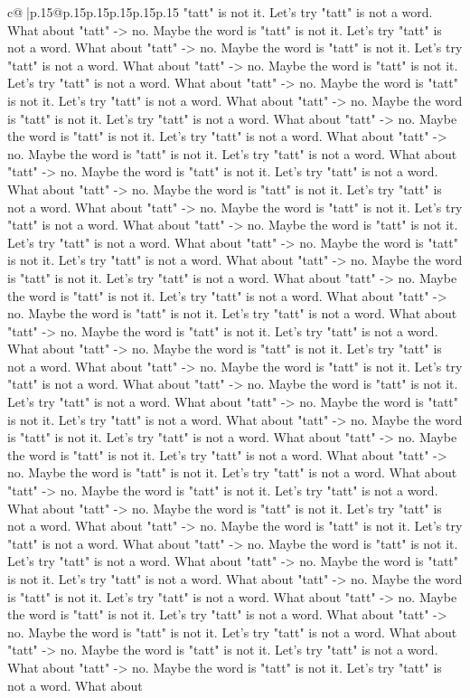 \documentclass{article}
\begin{document}
{\begin{supertabular}{c@{$\;$}|p{.15\linewidth}@{}p{.15\linewidth}p{.15\linewidth}p{.15\linewidth}p{.15\linewidth}p{.15\linewidth}}
{{{"tatt" is not it. Let's try "tatt" is not a word. What about "tatt" {-}> no. Maybe the word is "tatt" is not it. Let's try "tatt" is not a word. What about "tatt" {-}> no. Maybe the word is "tatt" is not it. Let's try "tatt" is not a word. What about "tatt" {-}> no. Maybe the word is "tatt" is not it. Let's try "tatt" is not a word. What about "tatt" {-}> no. Maybe the word is "tatt" is not it. Let's try "tatt" is not a word. What about "tatt" {-}> no. Maybe the word is "tatt" is not it. Let's try "tatt" is not a word. What about "tatt" {-}> no. Maybe the word is "tatt" is not it. Let's try "tatt" is not a word. What about "tatt" {-}> no. Maybe the word is "tatt" is not it. Let's try "tatt" is not a word. What about "tatt" {-}> no. Maybe the word is "tatt" is not it. Let's try "tatt" is not a word. What about "tatt" {-}> no. Maybe the word is "tatt" is not it. Let's try "tatt" is not a word. What about "tatt" {-}> no. Maybe the word is "tatt" is not it. Let's try "tatt" is not a word. What about "tatt" {-}> no. Maybe the word is "tatt" is not it. Let's try "tatt" is not a word. What about "tatt" {-}> no. Maybe the word is "tatt" is not it. Let's try "tatt" is not a word. What about "tatt" {-}> no. Maybe the word is "tatt" is not it. Let's try "tatt" is not a word. What about "tatt" {-}> no. Maybe the word is "tatt" is not it. Let's try "tatt" is not a word. What about "tatt" {-}> no. Maybe the word is "tatt" is not it. Let's try "tatt" is not a word. What about "tatt" {-}> no. Maybe the word is "tatt" is not it. Let's try "tatt" is not a word. What about "tatt" {-}> no. Maybe the word is "tatt" is not it. Let's try "tatt" is not a word. What about "tatt" {-}> no. Maybe the word is "tatt" is not it. Let's try "tatt" is not a word. What about "tatt" {-}> no. Maybe the word is "tatt" is not it. Let's try "tatt" is not a word. What about "tatt" {-}> no. Maybe the word is "tatt" is not it. Let's try "tatt" is not a word. What about "tatt" {-}> no. Maybe the word is "tatt" is not it. Let's try "tatt" is not a word. What about "tatt" {-}> no. Maybe the word is "tatt" is not it. Let's try "tatt" is not a word. What about "tatt" {-}> no. Maybe the word is "tatt" is not it. Let's try "tatt" is not a word. What about "tatt" {-}> no. Maybe the word is "tatt" is not it. Let's try "tatt" is not a word. What about "tatt" {-}> no. Maybe the word is "tatt" is not it. Let's try "tatt" is not a word. What about "tatt" {-}> no. Maybe the word is "tatt" is not it. Let's try "tatt" is not a word. What about "tatt" {-}> no. Maybe the word is "tatt" is not it. Let's try "tatt" is not a word. What about "tatt" {-}> no. Maybe the word is "tatt" is not it. Let's try "tatt" is not a word. What about "tatt" {-}> no. Maybe the word is "tatt" is not it. Let's try "tatt" is not a word. What about "tatt" {-}> no. Maybe the word is "tatt" is not it. Let's try "tatt" is not a word. What about "tatt" {-}> no. Maybe the word is "tatt" is not it. Let's try "tatt" is not a word. What about "tatt" {-}> no. Maybe the word is "tatt" is not it. Let's try "tatt" is not a word. What about "tatt" {-}> no. Maybe the word is "tatt" is not it. Let's try "tatt" is not a word. What about }}}
\end{supertabular}}
\end{document}

